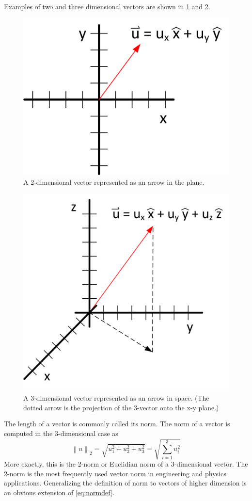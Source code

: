 \documentclass[onefignum,onetabnum]{siamart190516}
\begin{document}
Examples of two and three dimensional vectors are shown 
in \cref{fig:2DVectorAsArrowInPlane} and \cref{fig:3DVectorAsArrowInSpace}.
\begin{figure}[tbh]
	\centering
	\includegraphics[width=0.4\columnwidth]{2DVectorAsArrowInPlane.png}
	\caption{A 2-dimensional vector represented as an arrow in the plane.}
	\label{fig:2DVectorAsArrowInPlane}
\end{figure}
\begin{figure}[tbh]
	\centering
	\includegraphics[width=0.6\columnwidth]{3DVectorAsArrowInSpace.png}
	\caption{A 3-dimensional vector represented as an arrow in space.  (The dotted
		arrow is the projection of the 3-vector onto the x-y plane.)}
	\label{fig:3DVectorAsArrowInSpace}
\end{figure}
The length of a vector is commonly called its
norm.  The norm of a vector is computed in the 3-dimensional case as
\begin{equation}
\left\lVert{u}\right\rVert_2 = \sqrt{u_1^2 + u_2^2 + u_3^2} = \sqrt{\sum_{i=1}^3 u_i^2}
\label{eq:normdef}
\end{equation}
More exactly, this is the 2-norm or Euclidian norm of a 3-dimensional vector.
The 2-norm is the most frequently
used vector norm in engineering and physics applications.   
Generalizing the definition of norm to vectors of
higher dimension is an obvious extension of \cref{eq:normdef}.
\end{document}
